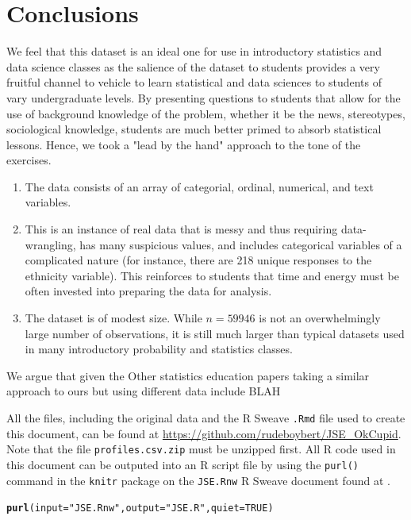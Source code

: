 \documentclass{article}\usepackage[]{graphicx}\usepackage[]{color}
\makeatletter
\newcommand{\hlnum}[1]{\textcolor[rgb]{0.686,0.059,0.569}{#1}}%
\newcommand{\hlstr}[1]{\textcolor[rgb]{0.192,0.494,0.8}{#1}}%
\newcommand{\hlstd}[1]{\textcolor[rgb]{0.345,0.345,0.345}{#1}}%
\newcommand{\hlkwc}[1]{\textcolor[rgb]{0.333,0.667,0.333}{#1}}%
\newcommand{\hlkwd}[1]{\textcolor[rgb]{0.737,0.353,0.396}{\textbf{#1}}}%
\newenvironment{kframe}{%
 \def\at@end@of@kframe{}%
 \ifinner\ifhmode%
  \def\at@end@of@kframe{\end{minipage}}%
  \begin{minipage}{\columnwidth}%
 \fi\fi%
 \def\FrameCommand##1{\hskip\@totalleftmargin \hskip-\fboxsep
 \colorbox{shadecolor}{##1}\hskip-\fboxsep
     \hskip-\linewidth \hskip-\@totalleftmargin \hskip\columnwidth}%
 \MakeFramed {\advance\hsize-\width
   \@totalleftmargin\z@ \linewidth\hsize
   \@setminipage}}%
 {\par\unskip\endMakeFramed%
 \at@end@of@kframe}
\newenvironment{knitrout}{}{} %
\makeatother
\begin{document}
%
\section{Conclusions}
%
We feel that this dataset is an ideal one for use in introductory statistics and data science classes as the salience of the dataset to students provides a very fruitful channel to vehicle to learn statistical and data sciences to students of vary undergraduate levels.  By presenting questions to students that allow for the use of background knowledge of the problem, whether it be the news, stereotypes, sociological knowledge, students are much better primed to absorb statistical lessons.  Hence, we took a "lead by the hand" approach to the tone of the exercises.

\begin{enumerate}
\item The data consists of an array of categorial, ordinal, numerical, and text variables.
\item This is an instance of real data that is messy and thus requiring data-wrangling, has many suspicious values, and includes categorical variables of a complicated nature (for instance, there are 218 unique responses to the ethnicity variable).  This reinforces to students that time and energy must be often invested into preparing the data for analysis.
\item The dataset is of modest size.  While $n = 59946$ is not an overwhelmingly large number of observations, it is still much larger than typical datasets used in many introductory probability and statistics classes.
\end{enumerate}

We argue that given the Other statistics education papers taking a similar approach to ours but using different data include BLAH

All the files, including the original data and the R Sweave \verb#.Rmd# file used to create this document, can be found at \url{https://github.com/rudeboybert/JSE_OkCupid}.  Note that the file \verb#profiles.csv.zip# must be unzipped first.  All R code used in this document can be outputed into an R script file by using the \verb#purl()# command in the \verb#knitr# package on the \verb#JSE.Rnw# R Sweave document found at .
\begin{knitrout}
\color{fgcolor}\begin{kframe}
\begin{alltt}
\hlkwd{purl}\hlstd{(}\hlkwc{input}\hlstd{=}\hlstr{"JSE.Rnw"}\hlstd{,} \hlkwc{output}\hlstd{=}\hlstr{"JSE.R"}\hlstd{,} \hlkwc{quiet}\hlstd{=}\hlnum{TRUE}\hlstd{)}
\end{alltt}
\end{kframe}
\end{knitrout}
\end{document}
